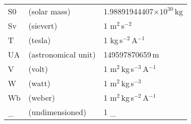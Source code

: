 \begin{table}
\begin{center}
\begin{tabular}{lll}
      S0       &   (solar mass)            &     1.98891944407$\times 10^{30}$\,kg\\
      Sv       &   (sievert)               &     1 m$^{2}$\,s$^{-2}$\\
      T        &   (tesla)                 &     1 kg\,s$^{-2}$\,A$^{-1}$\\
      UA       &   (astronomical unit)     &     149597870659\,m\\
      V        &   (volt)                  &     1 m$^{2}$\,kg\,s$^{-3}$\,A$^{-1}$\\
      W        &   (watt)                  &     1 m$^{2}$\,kg\,s$^{-3}$\\
      Wb       &   (weber)                 &     1 m$^{2}$\,kg\,s$^{-2}$\,A$^{-1}$\\
      \_        &   (undimensioned)         &     1 \_\\

\end{tabular}
\end{center}
\end{table}

\normalsize


